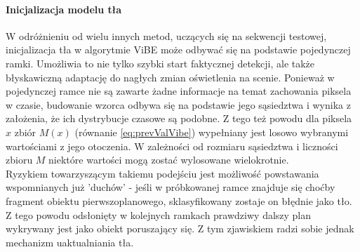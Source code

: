 \paragraph{Inicjalizacja modelu tła \\}
W odróżnieniu od wielu innych metod, uczących się na sekwencji testowej, inicjalizacja tła w algorytmie ViBE może odbywać się na podstawie pojedynczej ramki. Umożliwia to nie tylko szybki start faktycznej detekcji, ale także błyskawiczną adaptację do nagłych zmian oświetlenia na scenie. Ponieważ w pojedynczej ramce nie są zawarte żadne informacje na temat zachowania piksela w czasie, budowanie wzorca odbywa się na podstawie jego sąsiedztwa i wynika z założenia, że ich dystrybucje czasowe są podobne. Z tego też powodu dla piksela $x$ zbiór $M(x)$ (równanie \ref{eq:prevValVibe}) wypełniany jest losowo wybranymi wartościami z jego otoczenia. W zależności od rozmiaru sąsiedztwa i liczności zbioru $M$ niektóre wartości mogą zostać wylosowane wielokrotnie.\\
Ryzykiem towarzyszącym takiemu podejściu jest możliwość powstawania wspomnianych już 'duchów' - jeśli w próbkowanej ramce znajduje się choćby fragment obiektu pierwszoplanowego, sklasyfikowany zostaje on błędnie jako tło. Z tego powodu odsłonięty w kolejnych ramkach prawdziwy dalszy plan wykrywany jest jako obiekt poruszający się. Z tym zjawiskiem radzi sobie jednak mechanizm uaktualniania tła.
